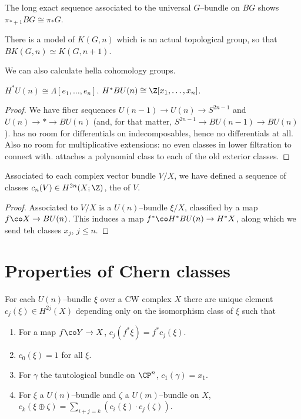 \begin{corollary}
The long exact sequence associated to the universal $G$--bundle on $BG$ shows $\pi_{* + 1} BG \cong \pi_* G$.
\end{corollary}

\begin{remark}
There is a model of $K(G, n)$ which is an actual topological group, so that $BK(G, n) \simeq K(G, n+1)$.
\end{remark}

We can also calculate hella cohomology groups.

\begin{theorem}
$H^* U(n) \cong \Lambda[e_1, \ldots, e_n]$.  $H^* BU(n) \cong \Z[x_1, \ldots, x_n]$.
\end{theorem}
\begin{proof}
We have fiber sequences $U(n-1) \to U(n) \to S^{2n-1}$ and $U(n) \to * \to BU(n)$ (and, for that matter, $S^{2n-1} \to BU(n-1) \to BU(n)$).   has no room for differentials on indecomposables, hence no differentials at all.  Also no room for multiplicative extensions: no even classes in lower filtration to connect with.   attaches a polynomial class to each of the old exterior classes.
\end{proof}

\begin{corollary}
Associated to each complex vector bundle $V / X$, we have defined a sequence of classes $c_n(V) \in H^{2n}(X; \Z)$, the  of $V$.
\end{corollary}
\begin{proof}
Associated to $V/X$ is a $U(n)$--bundle $\xi / X$, classified by a map $f\co X \to BU(n)$.  This induces a map $f^*\co H^* BU(n) \to H^* X$, along which we send teh classes $x_j$, $j \le n$.
\end{proof}




\section{Properties of Chern classes}

\begin{theorem}
For each $U(n)$--bundle $\xi$ over a CW complex $X$ there are unique element $c_j(\xi) \in H^{2j}(X)$ depending only on the isomorphism class of $\xi$ such that
\begin{enumerate}
    \item For a map $f\co Y \to X$, $c_j(f^* \xi) = f^* c_j(\xi)$.
    \item $c_0(\xi) = 1$ for all $\xi$.
    \item For $\gamma$ the tautological bundle on $\CP^n$, $c_1(\gamma) = x_1$.
    \item For $\xi$ a $U(n)$--bundle and $\zeta$ a $U(m)$--bundle on $X$, $c_k(\xi \oplus \zeta) = \sum_{i+j=k} (c_i(\xi) \cdot c_j(\zeta))$.
\end{enumerate}
\end{theorem}

